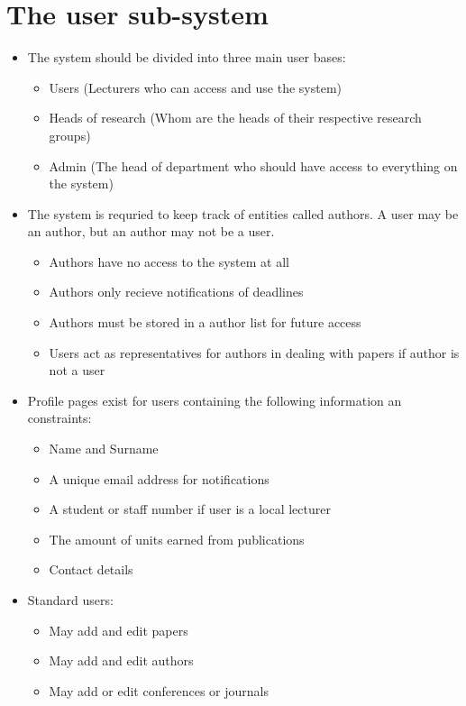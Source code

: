 \documentclass[a4paper]{article}
\begin{document}
\section{The user sub-system}
	\begin{itemize}
		\item The system should be divided into three main user bases:
		\begin{itemize}
			\item Users (Lecturers who can access and use the system)
			\item Heads of research (Whom are the heads of their respective research groups)
            \item Admin (The head of department who should have access to everything on the system)
		\end{itemize}
		\item The system is requried to keep track of entities called authors. A user may be an author, but an author may not be a user.
        \begin{itemize}
			\item Authors have no access to the system at all
			\item Authors only recieve notifications of deadlines
            \item Authors must be stored in a author list for future access
            \item Users act as representatives for authors in dealing with papers if author is not a user
		\end{itemize}
		\item Profile pages exist for users containing the following information an constraints:
		\begin{itemize}
			\item Name and Surname
			\item A unique email address for notifications
			\item A student or staff number if user is a local lecturer
			\item The amount of units earned from publications
            \item Contact details
		\end{itemize}
        \item Standard users:
		\begin{itemize}
			\item May add and edit papers
			\item May add and edit authors
			\item May add or edit conferences or journals

\end{itemize}
\end{itemize}
\end{document}

